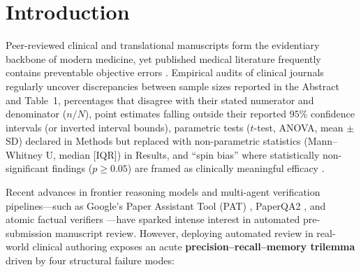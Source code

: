 \documentclass[11pt,a4paper]{article}
\begin{document}
\section{Introduction}
\label{sec:intro}

Peer-reviewed clinical and translational manuscripts form the evidentiary backbone of modern medicine, yet published medical literature frequently contains preventable objective errors \cite{schulz2010consort,vandenbroucke2007strobe,boutron2010spin}. Empirical audits of clinical journals regularly uncover discrepancies between sample sizes reported in the Abstract and Table~1, percentages that disagree with their stated numerator and denominator ($n/N$), point estimates falling outside their reported $95\%$ confidence intervals (or inverted interval bounds), parametric tests ($t$-test, ANOVA, mean $\pm$ SD) declared in Methods but replaced with non-parametric statistics (Mann--Whitney U, median [IQR]) in Results, and ``spin bias'' where statistically non-significant findings ($p \ge 0.05$) are framed as clinically meaningful efficacy \cite{boutron2010spin,page2021prisma,bossuyt2015stard}.

Recent advances in frontier reasoning models \cite{deepseekv3_2024,deepseekr1_2025} and multi-agent verification pipelines---such as Google's Paper Assistant Tool (PAT) \cite{googlepat2026}, PaperQA2 \cite{skarlinski2024paperqa2}, and atomic factual verifiers \cite{min2023factscore,gao2023alce}---have sparked intense interest in automated pre-submission manuscript review. However, deploying automated review in real-world clinical authoring exposes an acute \textbf{precision--recall--memory trilemma} driven by four structural failure modes:
\end{document}
